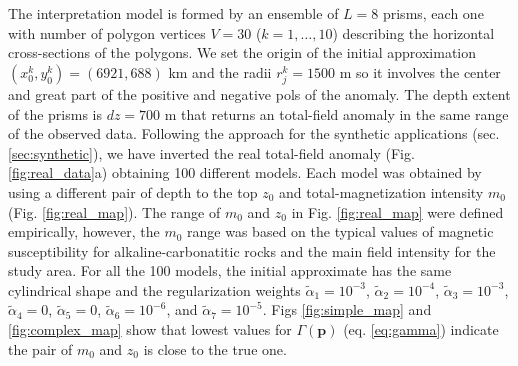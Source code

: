 The interpretation model is formed by an ensemble of $L = 8$ prisms, each one with number of polygon vertices $V = 30$ ($k = 1, \dots , 10$) describing the horizontal cross-sections of the polygons. We set the origin of the initial approximation $(x_0^k, y_0^k) = (6921, 688)$ km and the radii $r_j^k = 1500$ m so it involves the center and great part of the positive and negative pols of the anomaly. The depth extent of the prisms is $dz = 700$ m that returns an total-field anomaly in the same range of the observed data. Following the approach for the synthetic applications (sec. \ref{sec:synthetic}), we have inverted the real total-field anomaly (Fig. \ref{fig:real_data}a) obtaining 100 different models. Each model was obtained by using a different pair of depth to the top $z_0$ and total-magnetization intensity $m_0$ (Fig. \ref{fig:real_map}). The range of $m_0$ and $z_0$ in Fig. \ref{fig:real_map} were defined empirically, however, the $m_0$ range was based on the typical values of magnetic susceptibility for alkaline-carbonatitic rocks and the main field intensity for the study area. For all the 100 models, the initial approximate has the same cylindrical shape and the regularization weights $\tilde{\alpha}_1 = 10^{-3}$, $\tilde{\alpha}_2 = 10^{-4}$, $\tilde{\alpha}_3 = 10^{-3}$, $\tilde{\alpha}_4 = 0$, $\tilde{\alpha}_5 = 0$, $\tilde{\alpha}_6 = 10^{-6}$, and $\tilde{\alpha}_7 = 10^{-5}$. Figs \ref{fig:simple_map} and \ref{fig:complex_map} show that lowest values for $\Gamma(\mathbf{p})$ (eq. \ref{eq:gamma}) indicate the pair of $m_0$ and $z_0$ is close to the true one.

